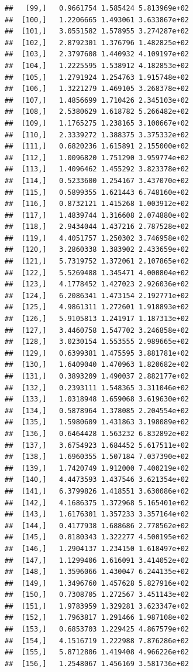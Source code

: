 \documentclass[article]{jss}\usepackage[]{graphicx}\usepackage[]{xcolor}
\makeatletter
\newenvironment{kframe}{%
 \def\at@end@of@kframe{}%
 \ifinner\ifhmode%
  \def\at@end@of@kframe{\end{minipage}}%
  \begin{minipage}{\columnwidth}%
 \fi\fi%
 \def\FrameCommand##1{\hskip\@totalleftmargin \hskip-\fboxsep
 \colorbox{shadecolor}{##1}\hskip-\fboxsep
     \hskip-\linewidth \hskip-\@totalleftmargin \hskip\columnwidth}%
 \MakeFramed {\advance\hsize-\width
   \@totalleftmargin\z@ \linewidth\hsize
   \@setminipage}}%
 {\par\unskip\endMakeFramed%
 \at@end@of@kframe}
\newenvironment{knitrout}{}{} %
\makeatother
\begin{document}
\begin{knitrout}
\begin{kframe}
\begin{verbatim}
##   [99,]   0.9661754 1.585424 5.813969e+02
##  [100,]   1.2206665 1.493061 3.633867e+02
##  [101,]   3.0551582 1.578955 3.274287e+02
##  [102,]   2.8792301 1.376796 1.482825e+02
##  [103,]   2.3797608 1.440932 4.109197e+02
##  [104,]   1.2225595 1.538912 4.182853e+02
##  [105,]   1.2791924 1.254763 1.915748e+02
##  [106,]   1.3221279 1.469105 3.268378e+02
##  [107,]   1.4856699 1.710426 2.345103e+02
##  [108,]   2.5380629 1.618782 5.266482e+02
##  [109,]   1.1765275 1.238165 3.100667e+02
##  [110,]   2.3339272 1.388375 3.375332e+02
##  [111,]   0.6820236 1.615891 2.155000e+02
##  [112,]   1.0096820 1.751290 3.959774e+02
##  [113,]   1.4096462 1.455292 3.823378e+02
##  [114,]   0.5233600 1.254167 3.437070e+02
##  [115,]   0.5899355 1.621443 6.748160e+02
##  [116,]   0.8732121 1.415268 1.003912e+02
##  [117,]   1.4839744 1.316608 2.074880e+02
##  [118,]   2.9434044 1.437216 2.787528e+02
##  [119,]   4.4051757 1.250302 3.746958e+02
##  [120,]   3.2860338 1.383902 2.433659e+02
##  [121,]   5.7319752 1.372061 2.107865e+02
##  [122,]   5.5269488 1.345471 4.000804e+02
##  [123,]   4.1778452 1.427023 2.926036e+02
##  [124,]   6.2086341 1.473154 2.192771e+02
##  [125,]   4.9861311 1.272601 1.918893e+02
##  [126,]   5.9105813 1.241917 1.187313e+02
##  [127,]   3.4460758 1.547702 3.246858e+02
##  [128,]   3.0230154 1.553555 2.989665e+02
##  [129,]   0.6399381 1.475595 3.881781e+02
##  [130,]   1.6409040 1.470963 1.820682e+02
##  [131,]   0.3893209 1.490037 2.882177e+02
##  [132,]   0.2393111 1.548365 3.311046e+02
##  [133,]   1.0318948 1.659068 3.619630e+02
##  [134,]   0.5878964 1.378085 2.204554e+02
##  [135,]   1.5980609 1.431863 3.198089e+02
##  [136,]   0.6464428 1.563232 6.832892e+02
##  [137,]   3.6754923 1.684452 5.617511e+02
##  [138,]   1.6960355 1.507184 7.037390e+02
##  [139,]   1.7420749 1.912000 7.400219e+02
##  [140,]   4.4473593 1.437546 3.621354e+02
##  [141,]   6.3799826 1.418551 3.630086e+02
##  [142,]   4.1686375 1.372968 5.165401e+02
##  [143,]   1.6176301 1.357233 3.357164e+02
##  [144,]   0.4177938 1.688686 2.778562e+02
##  [145,]   0.8180343 1.322277 4.500195e+02
##  [146,]   1.2904137 1.234150 1.618497e+02
##  [147,]   1.1299406 1.616091 3.414052e+02
##  [148,]   1.3596066 1.430047 6.244135e+02
##  [149,]   1.3496760 1.457628 5.827916e+02
##  [150,]   0.7308705 1.272567 3.451143e+02
##  [151,]   1.9783959 1.329281 3.623347e+02
##  [152,]   1.7963817 1.291466 1.987108e+02
##  [153,]   0.6853703 1.229425 4.867579e+02
##  [154,]   4.1516719 1.222988 7.876286e+02
##  [155,]   5.8712806 1.419408 4.966226e+02
##  [156,]   1.2548067 1.456169 3.581736e+02

\end{verbatim}
\end{kframe}
\end{knitrout}
\end{document}
